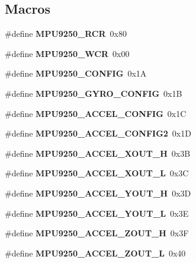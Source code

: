 \subsection*{Macros}
\begin{DoxyCompactItemize}
\item 
\mbox{\label{_i_m_u__functions_8h_a8f10e1abef86f90469efde459cc8e38a}} 
\#define {\bfseries M\+P\+U9250\+\_\+\+R\+CR}~0x80
\item 
\mbox{\label{_i_m_u__functions_8h_a04b6efd4a598a844bb53ed54aa34eca9}} 
\#define {\bfseries M\+P\+U9250\+\_\+\+W\+CR}~0x00
\item 
\mbox{\label{_i_m_u__functions_8h_a20204154f2c4969a76a4cfb351f092bd}} 
\#define {\bfseries M\+P\+U9250\+\_\+\+C\+O\+N\+F\+IG}~0x1A
\item 
\mbox{\label{_i_m_u__functions_8h_a8573879ec5b32b8e398fca47a6af8730}} 
\#define {\bfseries M\+P\+U9250\+\_\+\+G\+Y\+R\+O\+\_\+\+C\+O\+N\+F\+IG}~0x1B
\item 
\mbox{\label{_i_m_u__functions_8h_a98d764ea0ee5c3e4295ce7d1159d1b8f}} 
\#define {\bfseries M\+P\+U9250\+\_\+\+A\+C\+C\+E\+L\+\_\+\+C\+O\+N\+F\+IG}~0x1C
\item 
\mbox{\label{_i_m_u__functions_8h_af6cd76f367486f0c1c1a332d7969a80c}} 
\#define {\bfseries M\+P\+U9250\+\_\+\+A\+C\+C\+E\+L\+\_\+\+C\+O\+N\+F\+I\+G2}~0x1D
\item 
\mbox{\label{_i_m_u__functions_8h_a233902a190292b4092ed81dde3d9c741}} 
\#define {\bfseries M\+P\+U9250\+\_\+\+A\+C\+C\+E\+L\+\_\+\+X\+O\+U\+T\+\_\+H}~0x3B
\item 
\mbox{\label{_i_m_u__functions_8h_a68555dd7b566c506a3a903deba714188}} 
\#define {\bfseries M\+P\+U9250\+\_\+\+A\+C\+C\+E\+L\+\_\+\+X\+O\+U\+T\+\_\+L}~0x3C
\item 
\mbox{\label{_i_m_u__functions_8h_a74535eaadba66549faa09ba31a31f4b4}} 
\#define {\bfseries M\+P\+U9250\+\_\+\+A\+C\+C\+E\+L\+\_\+\+Y\+O\+U\+T\+\_\+H}~0x3D
\item 
\mbox{\label{_i_m_u__functions_8h_ad5d5e68cf15657c7ed9ec259a8cbcd81}} 
\#define {\bfseries M\+P\+U9250\+\_\+\+A\+C\+C\+E\+L\+\_\+\+Y\+O\+U\+T\+\_\+L}~0x3E
\item 
\mbox{\label{_i_m_u__functions_8h_ac112304e8cbba1dc9ccaa99773adf9cd}} 
\#define {\bfseries M\+P\+U9250\+\_\+\+A\+C\+C\+E\+L\+\_\+\+Z\+O\+U\+T\+\_\+H}~0x3F
\item 
\mbox{\label{_i_m_u__functions_8h_a964d6c7c4744ef0c32c22038f7025c05}} 
\#define {\bfseries M\+P\+U9250\+\_\+\+A\+C\+C\+E\+L\+\_\+\+Z\+O\+U\+T\+\_\+L}~0x40
\item 

\end{DoxyCompactItemize}
